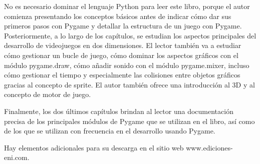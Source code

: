 No es necesario dominar el lenguaje Python para leer este libro, porque el autor comienza presentando los conceptos básicos antes de indicar cómo dar sus primeros pasos con Pygame y detallar la estructura de un juego con Pygame. Posteriormente, a lo largo de los capítulos, se estudian los aspectos principales del desarrollo de videojuegos en dos dimensiones. El lector también va a estudiar cómo gestionar un bucle de juego, cómo dominar los aspectos gráficos con el módulo pygame.draw, cómo añadir sonido con el módulo pygame.mixer, incluso cómo gestionar el tiempo y especialmente las colisiones entre objetos gráficos gracias al concepto de sprite. El autor también ofrece una introducción al 3D y al concepto de motor de juego.

Finalmente, los dos últimos capítulos brindan al lector una documentación precisa de los principales módulos de Pygame que se utilizan en el libro, así como de los que se utilizan con frecuencia en el desarrollo usando Pygame.

Hay elementos adicionales para su descarga en el sitio web www.ediciones-eni.com.




